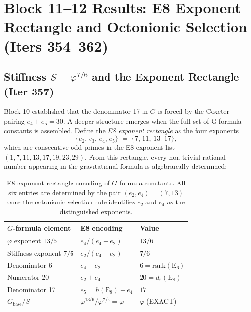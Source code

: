 \documentclass[aps,prd,twocolumn,superscriptaddress,floatfix,nofootinbib]{revtex4-2}
\theoremstyle{definition}
\theoremstyle{remark}
\newcommand{\vp}{\varphi}
\begin{document}
\section{Block 11--12 Results: E8 Exponent Rectangle and Octonionic Selection (Iters 354--362)}
\label{sec:block11-12}

\subsection{Stiffness $S = \vp^{7/6}$ and the Exponent Rectangle (Iter 357)}
\label{sec:exponent-rectangle}

Block 10 established that the denominator 17 in $G$ is forced by the Coxeter pairing
$e_4 + e_5 = 30$.  A deeper structure emerges when the full set of G-formula constants
is assembled.  Define the \textit{E8 exponent rectangle} as the four exponents
\begin{equation}
  \{e_2,\, e_3,\, e_4,\, e_5\} \;=\; \{7,\, 11,\, 13,\, 17\},
\end{equation}
which are consecutive odd primes in the E8 exponent list $(1,7,11,13,17,19,23,29)$.
From this rectangle, every non-trivial rational number appearing in the gravitational
formula is algebraically determined:

\begin{table}[h]
\centering
\caption{E8 exponent rectangle encoding of $G$-formula constants.
All six entries are determined by the pair $(e_2, e_4) = (7, 13)$ once the
octonionic selection rule identifies $e_2$ and $e_4$ as the distinguished exponents.}
\label{tab:exponent-rectangle}
\begin{tabular}{lll}
\toprule
$G$-formula element & E8 encoding & Value \\
\midrule
$\vp$ exponent $13/6$    & $e_4 / (e_4 - e_2)$               & $13/6$ \\
Stiffness exponent $7/6$ & $e_2 / (e_4 - e_2)$               & $7/6$ \\
Denominator 6            & $e_4 - e_2$                       & $6 = \mathrm{rank}(\mathrm{E}_6)$ \\
Numerator 20             & $e_2 + e_4$                       & $20 = d_6(\mathrm{E}_8)$ \\
Denominator 17           & $e_5 = h(\mathrm{E}_8) - e_4$     & $17$ \\
$G_{\mathrm{base}}/S$    & $\vp^{13/6}/\vp^{7/6} = \vp$     & $\vp$ (EXACT) \\
\bottomrule
\end{tabular}
\end{table}
\end{document}
